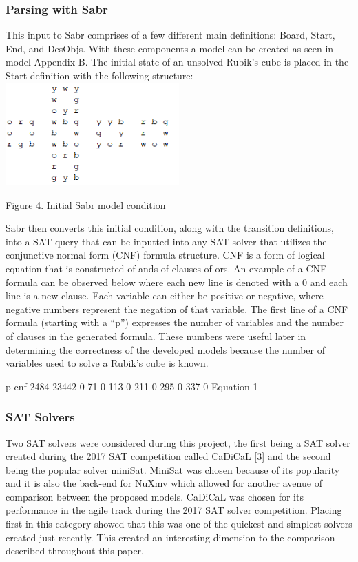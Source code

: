 \documentclass{article}
\begin{document}
\subsubsection{Parsing with Sabr}
This input to Sabr comprises of a few different main definitions: Board, Start, End, and DesObjs. With these components a model can be created as seen in model Appendix B. The initial state of an unsolved Rubik’s cube is placed in the Start definition with the following structure:\\[7mm]
\includegraphics[width=0.5\textwidth, center]{pics/initialsabrmodel.PNG} \\
\begin{center}
Figure 4. Initial Sabr model condition \\[7mm]
\end{center}
Sabr then converts this initial condition, along with the transition definitions, into a SAT query that can be inputted into any SAT solver that utilizes the conjunctive normal form (CNF) formula structure. CNF is a form of logical equation that is constructed of ands of clauses of ors. An example of a CNF formula can be observed below where each new line is denoted with a 0 and each line is a new clause. Each variable can either be positive or negative, where negative numbers represent the negation of that variable. The first line of a CNF formula (starting with a “p”) expresses the number of variables and the number of clauses in the generated formula. These numbers were useful later in determining the correctness of the developed models because the number of variables used to solve a Rubik’s cube is known. \\
\begin{center}
p cnf 2484 23442 0 71 0 113 0 211 0 295 0 337 0 \hfill Equation 1
\end{center}
\subsubsection{SAT Solvers}
Two SAT solvers were considered during this project, the first being a SAT solver created during the 2017 SAT competition called CaDiCaL [3] and the second being the popular solver miniSat. MiniSat was chosen because of its popularity and it is also the back-end for NuXmv which allowed for another avenue of comparison between the proposed models. CaDiCaL was chosen for its performance in the agile track during the 2017 SAT solver competition. Placing first in this category showed that this was one of the quickest and simplest solvers created just recently. This created an interesting dimension to the comparison described throughout this paper.
\end{document}
